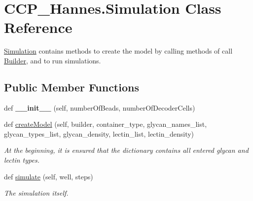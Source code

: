 \hypertarget{class_c_c_p___hannes_1_1_simulation}{}\section{C\+C\+P\+\_\+\+Hannes.\+Simulation Class Reference}
\label{class_c_c_p___hannes_1_1_simulation}


\mbox{\hyperlink{class_c_c_p___hannes_1_1_simulation}{Simulation}} contains methods to create the model by calling methods of call \mbox{\hyperlink{class_c_c_p___hannes_1_1_builder}{Builder}}, and to run simulations.  


\subsection*{Public Member Functions}
\begin{DoxyCompactItemize}
\item 
\mbox{\label{class_c_c_p___hannes_1_1_simulation_acce948d84267e7ebb00ac64022f5b4a1}} 
def {\bfseries \+\_\+\+\_\+init\+\_\+\+\_\+} (self, number\+Of\+Beads, number\+Of\+Decoder\+Cells)
\item 
def \mbox{\hyperlink{class_c_c_p___hannes_1_1_simulation_a9c38e62adf0444d0e97d068f2ee0daad}{create\+Model}} (self, builder, container\+\_\+type, glycan\+\_\+names\+\_\+list, glycan\+\_\+types\+\_\+list, glycan\+\_\+density, lectin\+\_\+list, lectin\+\_\+density)
\begin{DoxyCompactList}\small\item\em At the beginning, it is ensured that the dictionary contains all entered glycan and lectin types. \end{DoxyCompactList}\item 
def \mbox{\hyperlink{class_c_c_p___hannes_1_1_simulation_afa30032fef44f31161729fd781961893}{simulate}} (self, well, steps)
\begin{DoxyCompactList}\small\item\em The simulation itself. \end{DoxyCompactList}\end{DoxyCompactItemize}
